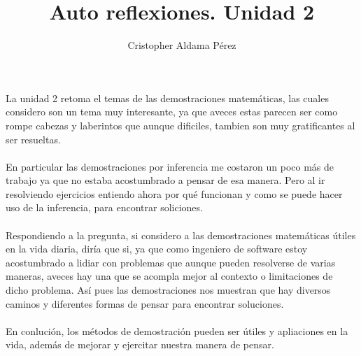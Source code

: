 \documentclass[a4paper,10pt]{article}
\title{Auto reflexiones. Unidad 2}
\author{Cristopher Aldama Pérez}
\begin{document}
\maketitle
La unidad 2 retoma el temas de las demostraciones matemáticas, las cuales considero son un tema muy interesante, ya que aveces estas parecen ser como rompe cabezas y laberintos que aunque dificiles, tambien son muy gratificantes al ser resueltas. 
\\
\\En particular las demostraciones por inferencia me costaron un poco más de trabajo ya que no estaba acostumbrado a pensar de esa manera. Pero al ir resolviendo ejercicios entiendo ahora por qué funcionan y como se puede hacer uso de la inferencia, para encontrar soliciones.
\\
\\Respondiendo a la pregunta, si considero a las demostraciones matemáticas útiles en la vida diaria, diría que si, ya que como ingeniero de software estoy acostumbrado a lidiar con problemas que aunque pueden resolverse de varias maneras, aveces hay una que se acompla mejor al contexto o limitaciones de dicho problema. Así pues las demostraciones nos muestran que hay diversos caminos y diferentes formas de pensar para encontrar soluciones.
\\
\\En conlución, los métodos de demostración pueden ser útiles y apliaciones en la vida, además de mejorar y ejercitar nuestra manera de pensar.
\end{document}

